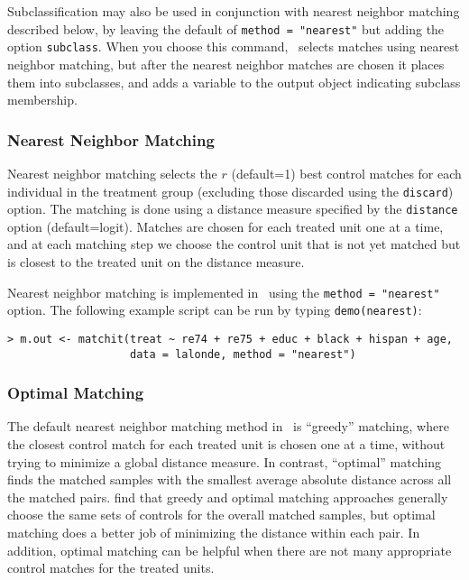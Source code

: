 Subclassification may also be used in conjunction with nearest
neighbor matching described below, by leaving the default of
\texttt{method = "nearest"} but adding the option \texttt{subclass}.
When you choose this command, \MatchIt\ selects matches using nearest neighbor
matching, but
after the nearest neighbor matches are chosen it places them into
subclasses, and adds a variable to the output object indicating subclass membership.


\subsubsection{Nearest Neighbor Matching}
\label{subsubsec:nearest}

Nearest neighbor matching selects the $r$ (default=1) best control
matches for each individual in the treatment group (excluding those
discarded using the \texttt{discard}) option.  The matching is done
using a distance measure specified by the {\tt distance} option
(default=logit).  Matches are chosen for each treated unit one at a
time, and at each matching step we choose the control unit that is not
yet matched but is closest to the treated unit on the distance
measure.

Nearest neighbor matching is implemented in \MatchIt\ using the
\texttt{method = "nearest"} option.  The following example script can
be run by typing {\tt demo(nearest)}:
\begin{verbatim}
> m.out <- matchit(treat ~ re74 + re75 + educ + black + hispan + age, 
                   data = lalonde, method = "nearest")
\end{verbatim}

\subsubsection{Optimal Matching}
\label{subsubsec:optimal}

The default nearest neighbor matching method in \MatchIt\ is
``greedy'' matching, where the closest control match for each treated
unit is chosen one at a time, without trying to minimize a global
distance measure.  In contrast, ``optimal'' matching finds the matched
samples with the smallest average absolute distance across all the
matched pairs.  \citet{GuRos93} find that greedy and optimal matching
approaches generally choose the same sets of controls for the overall
matched samples, but optimal matching does a better job of minimizing
the distance within each pair.  In addition, optimal matching can be
helpful when there are not many appropriate control matches for the
treated units.

